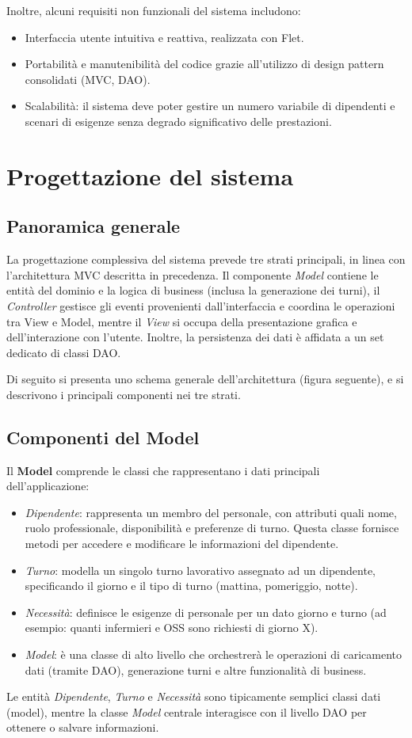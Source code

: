 \documentclass[a4paper,12pt]{report}
\begin{document}
Inoltre, alcuni requisiti non funzionali del sistema includono:
\begin{itemize}
    \item Interfaccia utente intuitiva e reattiva, realizzata con Flet.
    \item Portabilit\`a e manutenibilit\`a del codice grazie all'utilizzo di design pattern consolidati (MVC, DAO).
    \item Scalabilit\`a: il sistema deve poter gestire un numero variabile di dipendenti e scenari di esigenze senza degrado significativo delle prestazioni.
\end{itemize}

\chapter{Progettazione del sistema}
\label{cap:progettazione}
\section{Panoramica generale}
La progettazione complessiva del sistema prevede tre strati principali, in linea con l'architettura MVC descritta in precedenza. Il componente \emph{Model} contiene le entità del dominio e la logica di business (inclusa la generazione dei turni), il \emph{Controller} gestisce gli eventi provenienti dall'interfaccia e coordina le operazioni tra View e Model, mentre il \emph{View} si occupa della presentazione grafica e dell'interazione con l'utente. Inoltre, la persistenza dei dati \`e affidata a un set dedicato di classi DAO.

Di seguito si presenta uno schema generale dell'architettura (figura seguente), e si descrivono i principali componenti nei tre strati.

\section{Componenti del Model}
Il \textbf{Model} comprende le classi che rappresentano i dati principali dell'applicazione:
\begin{itemize}
    \item \emph{Dipendente}: rappresenta un membro del personale, con attributi quali nome, ruolo professionale, disponibilit\`a e preferenze di turno. Questa classe fornisce metodi per accedere e modificare le informazioni del dipendente.
    \item \emph{Turno}: modella un singolo turno lavorativo assegnato ad un dipendente, specificando il giorno e il tipo di turno (mattina, pomeriggio, notte).
    \item \emph{Necessit\`a}: definisce le esigenze di personale per un dato giorno e turno (ad esempio: quanti infermieri e OSS sono richiesti di giorno X).
    \item \emph{Model}: \`e una classe di alto livello che orchestrer\`a le operazioni di caricamento dati (tramite DAO), generazione turni e altre funzionalit\`a di business.
\end{itemize}
Le entit\`a \emph{Dipendente}, \emph{Turno} e \emph{Necessit\`a} sono tipicamente semplici classi dati (model), mentre la classe \emph{Model} centrale interagisce con il livello DAO per ottenere o salvare informazioni.
\end{document}
